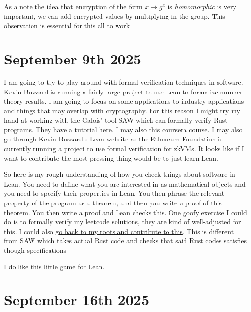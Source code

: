 \documentclass{amsart}
\theoremstyle{definition}
\begin{document}
As a note the idea that encryption of the form $x\mapsto g^x$ is \textit{homomorphic} is very important, we can add encrypted values by multiplying in the group. This observation is essential for this all to work



\section{September 9th 2025}

I am going to try to play around with formal verification techniques in software. Kevin Buzzard is running a fairly large project to use Lean to formalize number theory results. I am going to focus on some applications to industry applications and things that may overlap with cryptography. For this reason I might try my hand at working with the Galois' tool SAW which can formally verify Rust programs. They have a tutorial \href{https://galoisinc.github.io/saw-script/master/rust-verification-with-saw/index.html}{here}. I may also this \href{https://www.coursera.org/learn/introduction-to-modeling-for-formal-verification}{coursera course}. I may also go through \href{https://leanprover-community.github.io/}{Kevin Buzzard's Lean website} as the Ethereum Foundation is currently running a \href{https://verified-zkevm.org/}{project to use formal verification for zkVMs}. It looks like if I want to contribute the most pressing thing would be to just learn Lean.

So here is my rough understanding of how you check things about software in Lean. You need to define what you are interested in as mathematical objects and you need to specify their properties in Lean. You then phrase the relevant property of the program as a theorem, and then you write a proof of this theorem. You then write a proof and Lean checks this. One goofy exercise I could do is to formally verify my leetcode solutions, they are kind of well-adjusted for this. I could also \href{https://yaeldillies.github.io/Toric/?utm_source=chatgpt.com}{go back to my roots and contribute to this}. This is different from SAW which takes actual Rust code and checks that said Rust codes satisfies though specifications. 

I do like this little \href{https://www.ma.imperial.ac.uk/~buzzard/xena/natural_number_game/index2.html}{game} for Lean.

\section{September 16th 2025}
\end{document}
